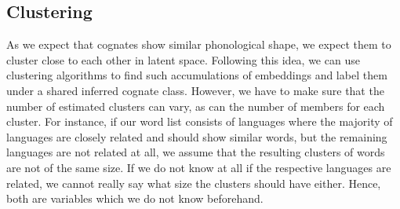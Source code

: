 \documentclass[6pt]{article}
\begin{document}
%

\subsection{Clustering}
\label{Clustering}
As we expect that cognates show similar phonological shape, we expect them to cluster close to each other in latent space. Following this idea, we can use clustering algorithms to find such accumulations of embeddings and label them under a shared inferred cognate class. However, we have to make sure that the number of estimated clusters can vary, as can the number of members for each cluster. For instance, if our word list consists of languages where the majority of languages are closely related and should show similar words, but the remaining languages are not related at all, we assume that the resulting clusters of words are not of the same size. If we do not know at all if the respective languages are related, we cannot really say what size the clusters should have either. Hence, both are variables which we do not know beforehand. 
\end{document}
